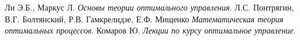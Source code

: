 \documentclass{article}
\theoremstyle{definition}
\begin{document}
	\newpage
	\newpage
\begin{thebibliography}{9}
   Ли Э.Б., Маркус Л. \emph{Основы теории оптимального управления}.
   Л.С. Понтрягин, В.Г. Болтянский, Р.В. Гамкрелидзе, Е.Ф. Мищенко \emph{Математическая теория оптимальных процессов}.
   Комаров Ю. \emph{Лекции по курсу оптимальное управление}.
\end{thebibliography}
\end{document}
